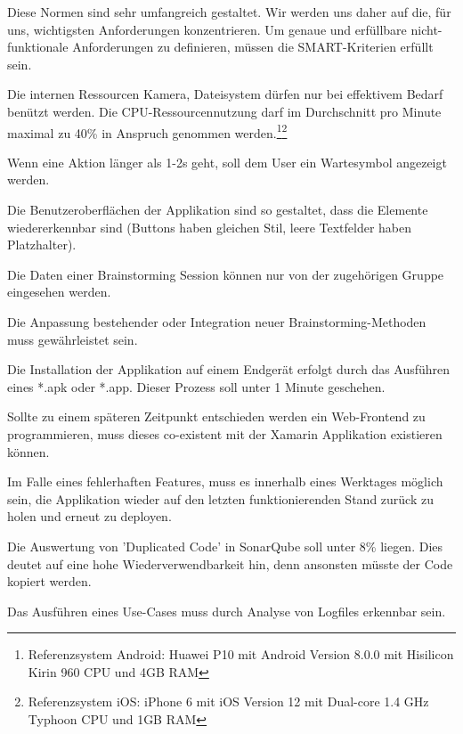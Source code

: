 
Diese Normen sind sehr umfangreich gestaltet. Wir werden uns daher auf die, für uns, wichtigsten Anforderungen konzentrieren. Um genaue und erfüllbare nicht-funktionale Anforderungen zu definieren, müssen die SMART-Kriterien \cite{SMART} erfüllt sein. 

\begin{description}[leftmargin=!,labelwidth=\widthof{\bfseries Wiederverwendbarkeit}]
	\item[Ressourcennutzung] Die internen Ressourcen Kamera, Dateisystem dürfen nur bei effektivem Bedarf benützt werden. Die CPU-Ressourcen\-nutzung darf im Durchschnitt pro Minute maximal zu 40\% in Anspruch genommen werden.\footnote{Referenzsystem Android: Huawei P10 mit Android Version 8.0.0 mit Hisilicon Kirin 960 CPU und 4GB RAM}\footnote{Referenzsystem iOS: iPhone 6 mit iOS Version 12 mit Dual-core 1.4 GHz Typhoon CPU und 1GB RAM}
	
	\item[Bedienbarkeit] Wenn eine Aktion länger als 1-2s geht, soll dem User ein Wartesymbol angezeigt werden. 
	
	\item[Ästhetik] Die Benutzeroberflächen der Applikation sind so gestaltet, dass die Elemente wiedererkennbar sind (Buttons haben gleichen Stil, leere Textfelder haben Platzhalter). 
	
	\item[Vertraulichkeit] Die Daten einer Brainstorming Session können nur von der zugehörigen Gruppe eingesehen werden. 
	
	\item[Anpassbarkeit] Die Anpassung bestehender oder Integration neuer Brain\-storming-Methoden muss gewährleistet sein.
	
	\item[Installierbarkeit] Die Installation der Applikation auf einem Endgerät erfolgt durch das Ausführen eines *.apk oder *.app. Dieser Prozess soll unter 1 Minute geschehen.
	
	\item[Co-Existenz] Sollte zu einem späteren Zeitpunkt entschieden werden ein Web-Frontend zu programmieren, muss dieses co-existent mit der Xamarin Applikation existieren können.
	
	\item[Wiederherstellbarkeit] Im Falle eines fehlerhaften Features, muss es innerhalb eines Werktages möglich sein, die Applikation wieder auf den letzten funktionierenden Stand zurück zu holen und erneut zu deployen.	
	
	\item[Wiederverwendbarkeit] Die Auswertung von 'Duplicated Code' in SonarQube soll unter 8\% liegen. Dies deutet auf eine hohe Wiederverwendbarkeit hin, denn ansonsten müsste der Code kopiert werden. 
	
	\item[Analysierbarkeit] Das Ausführen eines Use-Cases muss durch Analyse von Logfiles erkennbar sein.
\end{description}
